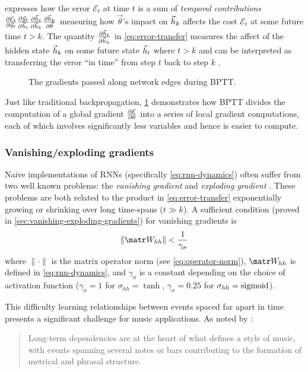  expresses how the error $\mathcal{E}_t$ at time $t$ is a sum
of \emph{temporal contributions} $
\frac{\partial \mathcal{E}_t}{\partial \vec{y}_t}
\frac{\partial \vec{y}_t}{\partial \vec{h}_t}
\frac{\partial \vec{h}_t}{\partial \vec{h}_k}
\frac{\partial \vec{h}_k}{\partial \vec{\theta}}$
measuring how $\vec{\theta}$'s impact on $\vec{h}_k$ affects the cost
$\mathcal{E}_t$ at some future time $t > k$. The quantity
$\frac{\partial \vec{h}_t}{\partial \vec{h}_k}$ in \cref{eq:error-transfer} measures the affect of
the hidden state $\vec{h}_k$ on some future state $\vec{h}_t$ where $t > k$ and can be
interpreted as transferring the error ``in time'' from step $t$ back to step
$k$ \citep{Pascanu2012}.

\begin{figure}[tb]
    \centering
    
    \caption{The gradients passed along network edges during BPTT.}
    \label{fig:rnn-bptt}
\end{figure}

Just like traditional backpropagation, \cref{fig:rnn-bptt} demonstrates how
BPTT divides the computation of a global gradient $\frac{\partial \mathcal{E}}{\partial
\theta}$ into a series of local gradient computations, each of which involves
significantly less variables and hence is easier to compute.

\subsubsection{Vanishing/exploding gradients}

Naive implementations of RNNs (specifically \cref{eq:rnn-dynamics}) often
suffer from two well known problems: the \emph{vanishing gradient} and
\emph{exploding gradient} \citep{Bengio1994}. These problems are both related
to the product in \cref{eq:error-transfer} exponentially growing or shrinking
over long time-spans (\ie $t \gg k$). A sufficient condition (proved in
\vref{sec:vanishing-exploding-gradients}) for vanishing gradients is
\begin{equation}\label{eq:vanishing-gradients-suff}
  \left\| \W_{hh} \right\| < \frac{1}{\gamma_\sigma}
\end{equation}
where $\| \cdot \|$ is the matrix operator norm (see \vref{eq:operator-norm}),
$\W_{hh}$ is defined in \vref{eq:rnn-dynamics},
and $\gamma_\sigma$ is a constant depending on the choice of activation function
(\eg $\gamma_\sigma = 1$ for $\sigma_{hh} = \tanh$, $\gamma_\sigma = 0.25$ for
$\sigma_{hh} = \operatorname*{sigmoid}$).

This difficulty learning relationships between events spaced far apart in time
presents a significant challenge for music applications. As noted by
\citet{cooper1963rhythmic}:
\begin{quote}
  Long-term dependencies are at the heart of what defines a style of music, with
  events spanning several notes or bars contributing to the formation of metrical and phrasal
  structure.
\end{quote}

